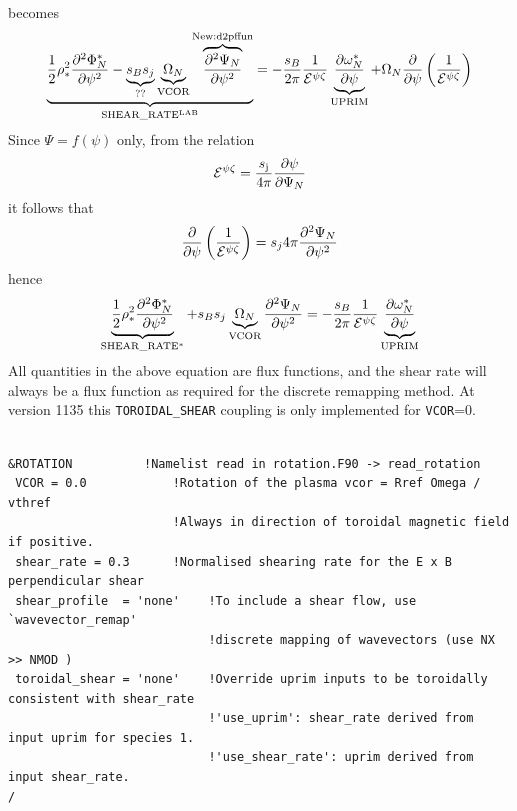 \documentclass{report}
\begin{document}
becomes
\begin{equation}
 \underbrace{{1 \over 2} \rho_*^2 {\partial^2 \Phi_N^* \over \partial \psi^2}
-\underbrace{s_B s_j}_{??}  \underbrace{\Omega_N}_{ \rm VCOR} \overbrace{\partial^2 \Psi_N \over
\partial \psi^2}^{\rm New: d2pffun}}_{\rm
SHEAR\_RATE^{LAB}} = - {s_B \over 2 \pi}{1 \over
\mathcal{E}^{\psi \zeta}}\underbrace{\partial \omega_N^* \over \partial \psi}_{\rm UPRIM} +
\Omega_N{\partial \over \partial \psi} \left({1 \over \mathcal{E}^{\psi \zeta}}\right) 
\end{equation}
Since $\Psi=f(\psi)$ only, from the relation 
\begin{equation} 
{\cal E}^{\psi \zeta} = \frac{s_{\rm j}}{4\pi}\frac{\partial \psi}{\partial \Psi_N}
\label{efun_cst}
\end{equation}
it follows that
\begin{equation}
 {\partial \over \partial \psi} \left({1 \over \mathcal{E}^{\psi \zeta}}\right) = s_j 4 \pi 
{\partial^2 \Psi_N \over \partial \psi^2}
\end{equation}
hence
\begin{equation}
 \underbrace{{1 \over 2} \rho_*^2 {\partial^2 \Phi_N^* \over \partial \psi^2}}_{\rm SHEAR\_RATE^*}
+s_B s_j \underbrace{\Omega_N}_{\rm VCOR} {\partial^2 \Psi_N \over
\partial \psi^2} = - {s_B \over 2 \pi}{1 \over
\mathcal{E}^{\psi \zeta}}\underbrace{\partial \omega_N^* \over \partial \psi}_{\rm UPRIM}
\end{equation}
All quantities in the above equation are flux functions, and the shear rate will always be a
flux function as required for the discrete remapping method.   At version 1135 this
\texttt{TOROIDAL\_SHEAR} coupling is only implemented for \texttt{VCOR}=0.

\begin{footnotesize}
\begin{verbatim}

&ROTATION	       !Namelist read in rotation.F90 -> read_rotation
 VCOR = 0.0            !Rotation of the plasma vcor = Rref Omega / vthref
                       !Always in direction of toroidal magnetic field if positive.
 shear_rate = 0.3      !Normalised shearing rate for the E x B perpendicular shear 
 shear_profile  = 'none'    !To include a shear flow, use `wavevector_remap'
                            !discrete mapping of wavevectors (use NX >> NMOD ) 
 toroidal_shear = 'none'    !Override uprim inputs to be toroidally consistent with shear_rate
                            !'use_uprim': shear_rate derived from input uprim for species 1.
                            !'use_shear_rate': uprim derived from input shear_rate.
/
\end{verbatim}
\end{footnotesize}
\end{document}
